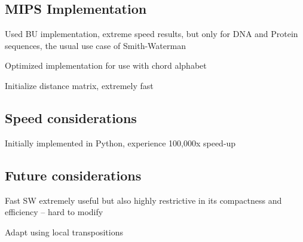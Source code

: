\subsection{MIPS Implementation}

\item Used BU implementation, extreme speed results, but only for DNA and Protein sequences, the usual use case of Smith-Waterman

\item Optimized implementation for use with chord alphabet

\item Initialize distance matrix, extremely fast

\subsection{Speed considerations}

\item Initially implemented in Python, experience 100,000x speed-up

\subsection{Future considerations}

\item Fast SW extremely useful but also highly restrictive in its compactness and efficiency -- hard to modify

\item Adapt using local transpositions